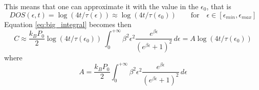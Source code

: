 \documentclass{article}
\begin{document}
This means that one can approximate it with the value in the $\epsilon_0$, that is
\begin{equation*}
    DOS(\epsilon, t) = \log(4t/\tau(\epsilon)) \approx \log(4t/\tau(\epsilon_0)) \qquad \text{for} \quad \epsilon \in [\epsilon_{min}, \epsilon_{max}]
\end{equation*}
Equation \ref{eq:big_integral} becomes then 
\begin{equation}
    C \approx \frac{k_BP_0}{2} \log(4t/\tau(\epsilon_0)) \ \int_0^{+\infty} \beta^2\epsilon^2 \frac{e^{\beta\epsilon}}{(e^{\beta\epsilon}+1)^2} \, d\epsilon =
    A \log(4t/\tau(\epsilon_0))
\end{equation}
where 
\begin{equation*}
    A = \frac{k_BP_0}{2} \int_0^{+\infty} \beta^2\epsilon^2 \frac{e^{\beta\epsilon}}{(e^{\beta\epsilon}+1)^2} \, d\epsilon
\end{equation*}
\end{document}
